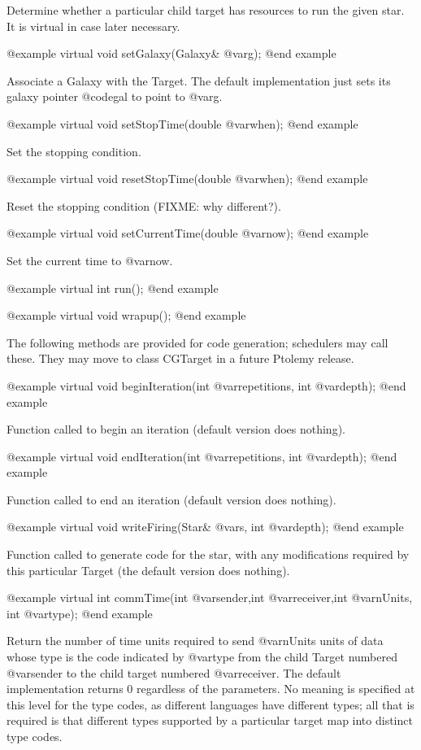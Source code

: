 Determine whether a particular child target has resources
to run the given star.  It is virtual in case later necessary.

@example
virtual void setGalaxy(Galaxy& @var{g});
@end example

Associate a Galaxy with the Target.  The default implementation
just sets its galaxy pointer @code{gal} to point to @var{g}.

@example
virtual void setStopTime(double @var{when});
@end example

Set the stopping condition.

@example
virtual void resetStopTime(double @var{when});
@end example

Reset the stopping condition (FIXME: why different?).

@example
virtual void setCurrentTime(double @var{now});
@end example

Set the current time to @var{now}.

@example
virtual int run();
@end example

@example
virtual void wrapup();
@end example

The following methods are provided for code generation; schedulers may
call these.  They may move to class CGTarget in a future Ptolemy release.

@example
virtual void beginIteration(int @var{repetitions}, int @var{depth});
@end example

Function called to begin an iteration (default version
does nothing).

@example
virtual void endIteration(int @var{repetitions}, int @var{depth});
@end example

Function called to end an iteration (default version
does nothing).

@example
virtual void writeFiring(Star& @var{s}, int @var{depth});
@end example

Function called to generate code for the star, with any modifications
required by this particular Target (the default version does nothing).

@example
virtual int commTime(int @var{sender},int @var{receiver},int @var{nUnits}, int @var{type});
@end example

Return the number of time units required to send @var{nUnits} units of
data whose type is the code indicated by @var{type} from the child Target
numbered @var{sender} to the child target numbered @var{receiver}.
The default implementation returns 0 regardless of the parameters.
No meaning is specified at this level for the type codes, as different
languages have different types; all that is required is that different
types supported by a particular target map into distinct type codes.

